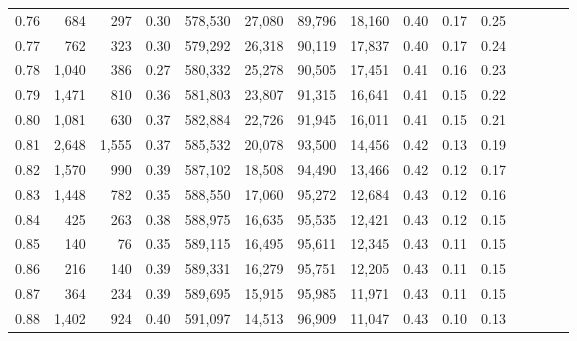 \begin{tabular}{rrrcrrrrrrrrrrr}
0.76 &     684 &    297 &                                       0.30 &  578,530 &   27,080 &   89,796 &   18,160 &  0.40 &  0.17 &                         0.25 \\
0.77 &     762 &    323 &                                       0.30 &  579,292 &   26,318 &   90,119 &   17,837 &  0.40 &  0.17 &                         0.24 \\
0.78 &   1,040 &    386 &                                       0.27 &  580,332 &   25,278 &   90,505 &   17,451 &  0.41 &  0.16 &                         0.23 \\
0.79 &   1,471 &    810 &                                       0.36 &  581,803 &   23,807 &   91,315 &   16,641 &  0.41 &  0.15 &                         0.22 \\
0.80 &   1,081 &    630 &                                       0.37 &  582,884 &   22,726 &   91,945 &   16,011 &  0.41 &  0.15 &                         0.21 \\
0.81 &   2,648 &  1,555 &                                       0.37 &  585,532 &   20,078 &   93,500 &   14,456 &  0.42 &  0.13 &                         0.19 \\
0.82 &   1,570 &    990 &                                       0.39 &  587,102 &   18,508 &   94,490 &   13,466 &  0.42 &  0.12 &                         0.17 \\
0.83 &   1,448 &    782 &                                       0.35 &  588,550 &   17,060 &   95,272 &   12,684 &  0.43 &  0.12 &                         0.16 \\
0.84 &     425 &    263 &                                       0.38 &  588,975 &   16,635 &   95,535 &   12,421 &  0.43 &  0.12 &                         0.15 \\
0.85 &     140 &     76 &                                       0.35 &  589,115 &   16,495 &   95,611 &   12,345 &  0.43 &  0.11 &                         0.15 \\
0.86 &     216 &    140 &                                       0.39 &  589,331 &   16,279 &   95,751 &   12,205 &  0.43 &  0.11 &                         0.15 \\
0.87 &     364 &    234 &                                       0.39 &  589,695 &   15,915 &   95,985 &   11,971 &  0.43 &  0.11 &                         0.15 \\
0.88 &   1,402 &    924 &                                       0.40 &  591,097 &   14,513 &   96,909 &   11,047 &  0.43 &  0.10 &                         0.13 \\

\end{tabular}
